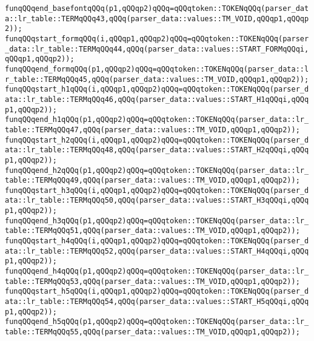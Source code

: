 \verb|funqQQqend_basefontqQQq(p1,qQQqp2)qQQq=qQQqtoken::TOKENqQQq(parser_data::lr_table::TERMqQQq43,qQQq(parser_data::values::TM_VOID,qQQqp1,qQQqp2));|\newline
\verb|funqQQqstart_formqQQq(i,qQQqp1,qQQqp2)qQQq=qQQqtoken::TOKENqQQq(parser_data::lr_table::TERMqQQq44,qQQq(parser_data::values::START_FORMqQQqi,qQQqp1,qQQqp2));|\newline
\verb|funqQQqend_formqQQq(p1,qQQqp2)qQQq=qQQqtoken::TOKENqQQq(parser_data::lr_table::TERMqQQq45,qQQq(parser_data::values::TM_VOID,qQQqp1,qQQqp2));|\newline
\verb|funqQQqstart_h1qQQq(i,qQQqp1,qQQqp2)qQQq=qQQqtoken::TOKENqQQq(parser_data::lr_table::TERMqQQq46,qQQq(parser_data::values::START_H1qQQqi,qQQqp1,qQQqp2));|\newline
\verb|funqQQqend_h1qQQq(p1,qQQqp2)qQQq=qQQqtoken::TOKENqQQq(parser_data::lr_table::TERMqQQq47,qQQq(parser_data::values::TM_VOID,qQQqp1,qQQqp2));|\newline
\verb|funqQQqstart_h2qQQq(i,qQQqp1,qQQqp2)qQQq=qQQqtoken::TOKENqQQq(parser_data::lr_table::TERMqQQq48,qQQq(parser_data::values::START_H2qQQqi,qQQqp1,qQQqp2));|\newline
\verb|funqQQqend_h2qQQq(p1,qQQqp2)qQQq=qQQqtoken::TOKENqQQq(parser_data::lr_table::TERMqQQq49,qQQq(parser_data::values::TM_VOID,qQQqp1,qQQqp2));|\newline
\verb|funqQQqstart_h3qQQq(i,qQQqp1,qQQqp2)qQQq=qQQqtoken::TOKENqQQq(parser_data::lr_table::TERMqQQq50,qQQq(parser_data::values::START_H3qQQqi,qQQqp1,qQQqp2));|\newline
\verb|funqQQqend_h3qQQq(p1,qQQqp2)qQQq=qQQqtoken::TOKENqQQq(parser_data::lr_table::TERMqQQq51,qQQq(parser_data::values::TM_VOID,qQQqp1,qQQqp2));|\newline
\verb|funqQQqstart_h4qQQq(i,qQQqp1,qQQqp2)qQQq=qQQqtoken::TOKENqQQq(parser_data::lr_table::TERMqQQq52,qQQq(parser_data::values::START_H4qQQqi,qQQqp1,qQQqp2));|\newline
\verb|funqQQqend_h4qQQq(p1,qQQqp2)qQQq=qQQqtoken::TOKENqQQq(parser_data::lr_table::TERMqQQq53,qQQq(parser_data::values::TM_VOID,qQQqp1,qQQqp2));|\newline
\verb|funqQQqstart_h5qQQq(i,qQQqp1,qQQqp2)qQQq=qQQqtoken::TOKENqQQq(parser_data::lr_table::TERMqQQq54,qQQq(parser_data::values::START_H5qQQqi,qQQqp1,qQQqp2));|\newline
\verb|funqQQqend_h5qQQq(p1,qQQqp2)qQQq=qQQqtoken::TOKENqQQq(parser_data::lr_table::TERMqQQq55,qQQq(parser_data::values::TM_VOID,qQQqp1,qQQqp2));|\newline
